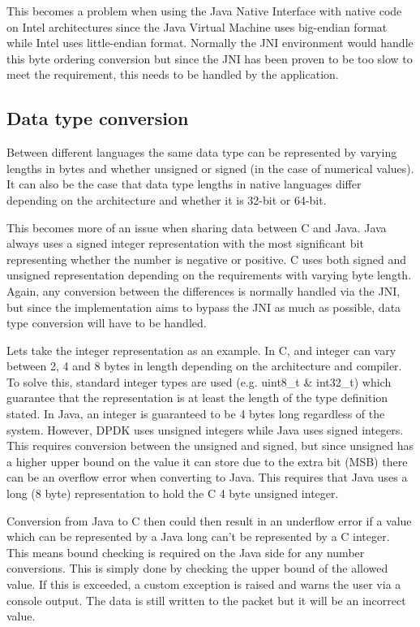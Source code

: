 \documentclass[final_report.tex]{subfiles}
\begin{document}
This becomes a problem when using the Java Native Interface with native code on Intel architectures since the Java Virtual Machine uses big-endian format while Intel uses little-endian format. Normally the JNI environment would handle this byte ordering conversion but since the JNI has been proven to be too slow to meet the requirement, this needs to be handled by the application.

\subsection{Data type conversion}
Between different languages the same data type can be represented by varying lengths in bytes and whether unsigned or signed (in the case of numerical values). It can also be the case that data type lengths in native languages differ depending on the architecture and whether it is 32-bit or 64-bit.

This becomes more of an issue when sharing data between C and Java. Java always uses a signed integer representation with the most significant bit representing whether the number is negative or positive. C uses both signed and unsigned representation depending on the requirements with varying byte length. Again, any conversion between the differences is normally handled via the JNI, but since the implementation aims to bypass the JNI as much as possible, data type conversion will have to be handled.

Lets take the integer representation as an example. In C, and integer can vary between 2, 4 and 8 bytes in length depending on the architecture and compiler. To solve this, standard integer types are used (e.g. uint8\_t \& int32\_t) which guarantee that the representation is at least the length of the type definition stated. In Java, an integer is guaranteed to be 4 bytes long regardless of the system. However, DPDK uses unsigned integers while Java uses signed integers. This requires conversion between the unsigned and signed, but since unsigned has a higher upper bound on the value it can store due to the extra bit (MSB) there can be an overflow error when converting to Java. This requires that Java uses a long (8 byte) representation to hold the C 4 byte unsigned integer.

Conversion from Java to C then could then result in an underflow error if a value which can be represented by a Java long can't be represented by a C integer. This means bound checking is required on the Java side for any number conversions. This is simply done by checking the upper bound of the allowed value. If this is exceeded, a custom exception is raised and warns the user via a console output. The data is still written to the packet but it will be an incorrect value.
\end{document}
